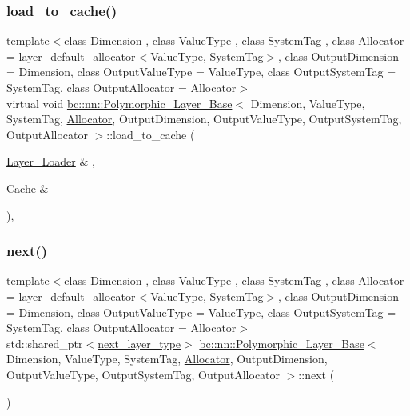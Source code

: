\subsubsection{\texorpdfstring{load\+\_\+to\+\_\+cache()}{load\_to\_cache()}\hspace{0.1cm}{\footnotesize\ttfamily [2/2]}}
{\footnotesize\ttfamily template$<$class Dimension , class Value\+Type , class System\+Tag , class Allocator  = layer\+\_\+default\+\_\+allocator$<$\+Value\+Type, System\+Tag$>$, class Output\+Dimension  = Dimension, class Output\+Value\+Type  = Value\+Type, class Output\+System\+Tag  = System\+Tag, class Output\+Allocator  = Allocator$>$ \\
virtual void \hyperlink{structbc_1_1nn_1_1Polymorphic__Layer__Base}{bc\+::nn\+::\+Polymorphic\+\_\+\+Layer\+\_\+\+Base}$<$ Dimension, Value\+Type, System\+Tag, \hyperlink{classbc_1_1allocators_1_1Allocator}{Allocator}, Output\+Dimension, Output\+Value\+Type, Output\+System\+Tag, Output\+Allocator $>$\+::load\+\_\+to\+\_\+cache (\begin{DoxyParamCaption}\item[{\hyperlink{structbc_1_1nn_1_1Layer__Loader}{Layer\+\_\+\+Loader} \&}]{,  }\item[{\hyperlink{structbc_1_1nn_1_1Cache}{Cache} \&}]{ }\end{DoxyParamCaption})\hspace{0.3cm}{\ttfamily [inline]}, {\ttfamily [virtual]}}

\mbox{\label{structbc_1_1nn_1_1Polymorphic__Layer__Base_afe77ff310be16c9357ea66bec8d6306b}} 
\subsubsection{\texorpdfstring{next()}{next()}\hspace{0.1cm}{\footnotesize\ttfamily [1/4]}}
{\footnotesize\ttfamily template$<$class Dimension , class Value\+Type , class System\+Tag , class Allocator  = layer\+\_\+default\+\_\+allocator$<$\+Value\+Type, System\+Tag$>$, class Output\+Dimension  = Dimension, class Output\+Value\+Type  = Value\+Type, class Output\+System\+Tag  = System\+Tag, class Output\+Allocator  = Allocator$>$ \\
std\+::shared\+\_\+ptr$<$\hyperlink{structbc_1_1nn_1_1Polymorphic__Layer__Base_ac7d70db83e8370d2975d05401713f677}{next\+\_\+layer\+\_\+type}$>$ \hyperlink{structbc_1_1nn_1_1Polymorphic__Layer__Base}{bc\+::nn\+::\+Polymorphic\+\_\+\+Layer\+\_\+\+Base}$<$ Dimension, Value\+Type, System\+Tag, \hyperlink{classbc_1_1allocators_1_1Allocator}{Allocator}, Output\+Dimension, Output\+Value\+Type, Output\+System\+Tag, Output\+Allocator $>$\+::next (\begin{DoxyParamCaption}{ }\end{DoxyParamCaption})\hspace{0.3cm}{\ttfamily [inline]}}


